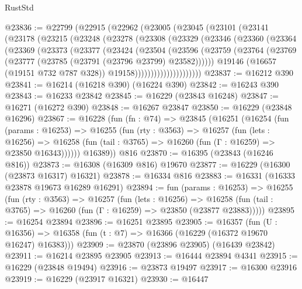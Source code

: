 \begin{lexlean}{RustStd}
\begin{coremodule}
@23836 := @22799
    (@22915
      (@22962
        (@23005
          (@23045
            (@23101
              (@23141
                (@23178
                  (@23215
                    (@23248
                      (@23278
                        (@23308
                          (@23329
                            (@23346
                              (@23360
                                (@23364
                                  (@23369
                                    (@23373
                                      (@23377
                                        (@23424
                                          (@23504
                                            (@23596
                                              (@23759
                                                (@23764
                                                  (@23769
                                                    (@23777
                                                      (@23785 (@23791 (@23796 @23799) @23582))))))
                                              @19146
                                              (@16657 (@19151 @732 @787 @328))
                                              @19158)))))))))))))))))))))
@23837 := @16212 @390
@23841 := @16214 (@16218 @390) (@16224 @390)
@23842 := @16243 @390
@23843 := @16233 @23842
@23845 := @16229 (@23843 @16248)
@23847 := @16271 (@16272 @390)
@23848 := @16267 @23847
@23850 := @16229 (@23848 @16296)
@23867 := @16228
    (fun (fn : @74) =>
    @23845
      (@16251
        (@16254
          (fun (params : @16253) =>
          @16255
            (fun (rty : @3563) =>
            @16257
              (fun (lets : @16256) =>
              @16258 (fun (tail : @3765) => @16260 (fun (Γ : @16259) => @23850 @16343))))))
        @16389))
    @816
@23870 := @16395 (@23843 (@16246 @816))
@23873 := @16308 (@16309 @816) @19670
@23877 := @16229 (@16300 (@23873 @16317) @16321)
@23878 := @16334 @816
@23883 := @16331 (@16333 @23878 @19673 @16289 @16291)
@23894 := fun (params : @16253) =>
  @16255
    (fun (rty : @3563) =>
    @16257
      (fun (lets : @16256) =>
      @16258 (fun (tail : @3765) => @16260 (fun (Γ : @16259) => @23850 (@23877 @23883)))))
@23895 := @16254 @23894
@23896 := @16251 @23895
@23905 := @16357
    (fun (U : @16356) => @16358 (fun (t : @7) => @16366 (@16229 (@16372 @19670 @16247) @16383)))
@23909 := @23870 (@23896 @23905) (@16439 @23842)
@23911 := @16214 @23895 @23905
@23913 := @16444 @23894 @4341
@23915 := @16229 (@23848 @19494)
@23916 := @23873 @19497
@23917 := @16300 @23916
@23919 := @16229 (@23917 @16321)
@23930 := @16447

\end{coremodule}
\end{lexlean}
